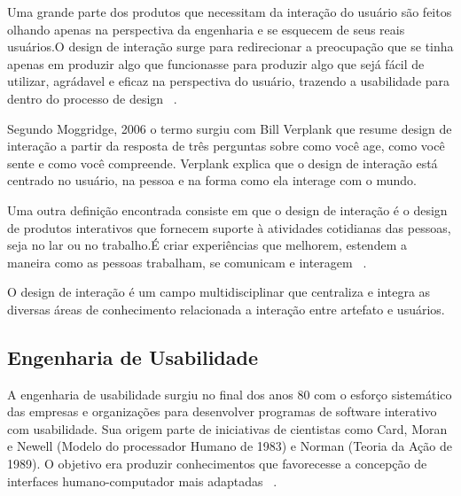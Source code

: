 	Uma grande parte dos produtos que necessitam da interação do usuário são feitos olhando apenas na perspectiva da engenharia e se esquecem de seus reais usuários.O design de interação surge para redirecionar a preocupação que se tinha apenas em produzir algo que funcionasse para produzir algo que sejá fácil de utilizar, agrádavel e eficaz na perspectiva do usuário, trazendo a usabilidade para dentro do processo de design ~\cite{preece2007}.

	Segundo Moggridge, 2006 o termo surgiu com Bill Verplank que resume design de interação a partir da resposta de três perguntas sobre como você age, como você sente e como você compreende. Verplank explica que o design de interação está centrado no usuário, na pessoa e na forma como ela interage com o mundo.
	
	Uma outra definição encontrada consiste em que o design de interação é o design de produtos interativos que fornecem suporte à atividades cotidianas das pessoas, seja no lar ou no trabalho.É criar experiências que melhorem, estendem a maneira como as pessoas trabalham, se comunicam e interagem ~\cite{preece2007}.

	O design de interação é um campo multidisciplinar que centraliza e integra as diversas áreas de conhecimento relacionada a interação entre artefato e usuários.


	





\subsection{Engenharia de Usabilidade}

A engenharia de usabilidade surgiu no final dos anos 80 com o esforço sistemático das empresas e organizações para desenvolver programas de software interativo com usabilidade. Sua origem parte de iniciativas de cientistas como Card, Moran e Newell (Modelo do processador Humano de 1983) e Norman (Teoria da Ação de 1989). O objetivo era produzir conhecimentos que favorecesse a concepção de interfaces humano-computador mais adaptadas ~\cite{cybis2010}.

